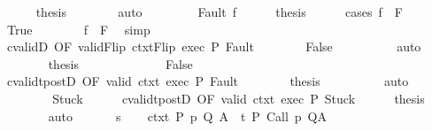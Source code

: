 \begin{isabellebody}
\ \ \ \ \isamarkupfalse%
\ {\isacharquery}thesis\isanewline
\ \ \ \ \ \ \isamarkupfalse%
\ auto\isanewline
\ \ \isamarkupfalse%
\isanewline
\ \ \ \ \isamarkupfalse%
\ {\isacharparenleft}Fault\ f{\isacharparenright}\isanewline
\ \ \ \ \isamarkupfalse%
\ {\isacharquery}thesis\isanewline
\ \ \ \ \isamarkupfalse%
\ {\isacharparenleft}cases\ {\isachardoublequoteopen}f\ {\isasymin}\ F{\isachardoublequoteclose}{\isacharparenright}\isanewline
\ \ \ \ \ \ \isamarkupfalse%
\ True\isanewline
\ \ \ \ \ \ \isamarkupfalse%
\ {\isachardoublequoteopen}f\ {\isasymnotin}\ {\isacharminus}F{\isachardoublequoteclose}\ \isamarkupfalse%
\ simp\isanewline
\ \ \ \ \ \ \isamarkupfalse%
\ cvalidD\ {\isacharbrackleft}OF\ validFlip\ ctxtFlip\ exec\ P{\isacharbrackright}\ Fault\isanewline
\ \ \ \ \ \ \isamarkupfalse%
\ False\isanewline
\ \ \ \ \ \ \ \ \isamarkupfalse%
\ auto\isanewline
\ \ \ \ \ \ \isamarkupfalse%
\ {\isacharquery}thesis\ \isacommand{{\isachardot}{\isachardot}}\isamarkupfalse%
\isanewline
\ \ \ \ \isamarkupfalse%
\isanewline
\ \ \ \ \ \ \isamarkupfalse%
\ False\isanewline
\ \ \ \ \ \ \isamarkupfalse%
\ cvalidt{\isacharunderscore}postD\ {\isacharbrackleft}OF\ valid\ ctxt{\isacharprime}\ exec\ P{\isacharbrackright}\ Fault\isanewline
\ \ \ \ \ \ \isamarkupfalse%
\ {\isacharquery}thesis\isanewline
\ \ \ \ \ \ \ \ \isamarkupfalse%
\ auto\isanewline
\ \ \ \ \isamarkupfalse%
\isanewline
\ \ \isamarkupfalse%
\isanewline
\ \ \ \ \isamarkupfalse%
\ Stuck\isanewline
\ \ \ \ \isamarkupfalse%
\ cvalidt{\isacharunderscore}postD\ {\isacharbrackleft}OF\ valid\ ctxt{\isacharprime}\ exec\ P{\isacharbrackright}\ Stuck\isanewline
\ \ \ \ \isamarkupfalse%
\ {\isacharquery}thesis\isanewline
\ \ \ \ \ \ \isamarkupfalse%
\ auto\isanewline
\ \ \isamarkupfalse%
\isanewline
{}\isamarkupfalse%
\isanewline
\ \ \isamarkupfalse%
\ s\isanewline
\ \ \isamarkupfalse%
\ ctxt{\isacharcolon}\ {\isachardoublequoteopen}{\isasymforall}{\isacharparenleft}P{\isacharcomma}\ p{\isacharcomma}\ Q{\isacharcomma}\ A{\isacharparenright}{\isasymin}{\isasymTheta}{\isachardot}\ {\isasymGamma}\ {\isasymTurnstile}\isactrlsub t\isactrlbsub {\isacharslash}{\isacharbraceleft}{\isacharbraceright}\isactrlesub \ P\ {\isacharparenleft}Call\ p{\isacharparenright}\ Q{\isacharcomma}A{\isachardoublequoteclose}\isanewline

\end{isabellebody}
